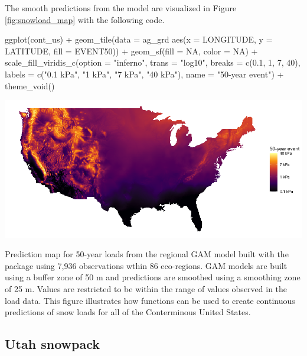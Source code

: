 The smooth predictions from the  model are visualized in Figure \ref{fig:snowload_map} with the following code.

\begin{example}
ggplot(cont_us) +
  geom_tile(data = ag_grd %
            aes(x = LONGITUDE, y = LATITUDE, fill = EVENT50)) +
  geom_sf(fill = NA, color = NA) +
  scale_fill_viridis_c(option = "inferno",
                       trans = "log10",
                       breaks = c(0.1, 1, 7, 40),
                       labels = c("0.1 kPa", "1 kPa", "7 kPa", "40 kPa"),
                       name = "50-year event") +
  theme_void()
\end{example}

\begin{widefigure}[htbp]
    \centering
    \includegraphics[width = \textwidth]{figures/snowload_map.png}
    \caption{Prediction map for 50-year loads from the regional GAM model built with the  package using 7,936 observations wthin 86 eco-regions. GAM models are built using a buffer zone of 50 m and predictions are smoothed using a smoothing zone of 25 m. Values are restricted to be within the range of values observed in the load data. This figure illustrates how  functions can be used to create continuous predictions of snow loads for all of the Conterminous United States.}
    \label{fig:snowload_map}
\end{widefigure}

\subsection{Utah snowpack}


